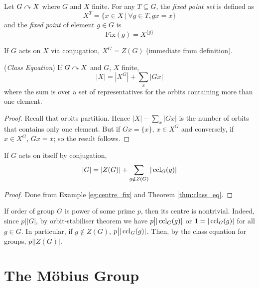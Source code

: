 \documentclass[10pt, a4paper, twoside]{report}
\begin{document}
\begin{definition}
    Let \(G\curvearrowright X\) where \(G\) and \(X\) finite. For any \(T\subseteq G\), the \emph{fixed point set} is defined as 
    \[X^T=\{x\in X\:|\:\forall g\in T, gx=x\}\]
    and the \emph{fixed point} of element \(g\in G\) is 
    \[\text{Fix}(g)=X^{\{g\}}\]
\end{definition}
\begin{example}
    If \(G\) acts on \(X\) via conjugation, \(X^G=Z(G)\) (immediate from definition).
    \label{eg:centre_fix}
\end{example}
\begin{theorem}
    (\emph{Class Equation}) If \(G\curvearrowright X\) and \(G\), \(X\) finite, 
    \[|X|=|X^G|+\sum_x|Gx|\]
    where the sum is over a set of representatives for the orbits containing more than one element.
    \label{thm:class_eq}
\end{theorem}
\begin{proof}
    Recall that orbits partition. Hence \(|X|-\sum_x|Gx|\) is the number of orbits that contains only one element. But if \(Gx=\{x\}\), \(x\in X^G\) and conversely, if \(x\in X^G\), \(Gx=x\); so the result follows.
\end{proof}
\begin{corollary}
    If \(G\) acts on itself by conjugation,
    \[|G|=|Z(G)|+\sum_{g\notin Z(G)}|\operatorname{ccl}_G(g)|\]
\end{corollary}
\begin{proof}
    Done from Example \ref{eg:centre_fix} and Theorem \ref{thm:class_eq}.
\end{proof}
\begin{example}
    If order of group \(G\) is power of some prime \(p\), then its centre is nontrivial. Indeed, since \(p\big||G|\), by orbit-stabiliser theorem we have \(p\big||\operatorname{ccl}_G(g)|\) or \(1=|\operatorname{ccl}_G(g)|\) for all \(g\in G\). In particular, if \(g\notin Z(G)\),  \(p\big||\operatorname{ccl}_G(g)|\). Then, by the class equation for groups, \(p\big||Z(G)|\).
\end{example}
\section{The Möbius Group}
\end{document}
